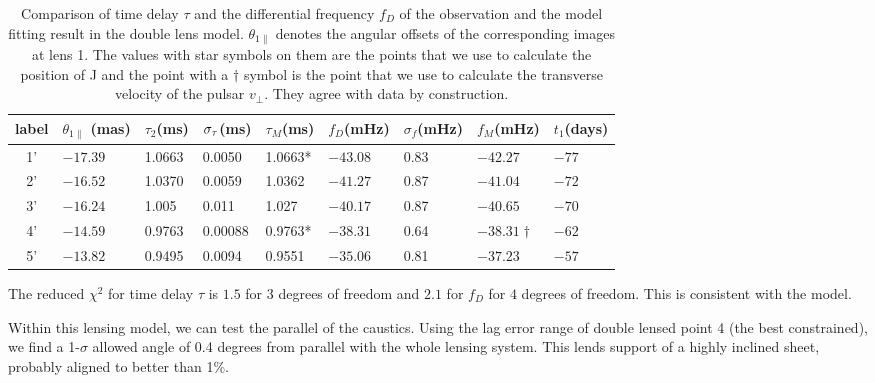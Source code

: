 \documentclass[useAMS,usenatbib]{mn2e}
\begin{document}
\begin{table}
\centering
\begin{tabular}{c|llllllll}
\hline
label&$\theta_{1\parallel}$ (mas)  & $\tau_2$(ms) & $\sigma_{\rm \tau}$(ms)  & $\tau_M$(ms) & $f_D$(mHz)  &$\sigma_{f}$(mHz)      &  $f_M$(mHz)& $t_1$(days) \\ \hline
1'& $-17.39$  &  1.0663     &0.0050    & 1.0663*        & $-43.08$    &0.83   & $-42.27$           & $-77$\\
 2'& $-16.52$  &    1.0370     &0.0059    & 1.0362       & $-41.27$    &0.87   & $-41.04$          & $-72$\\ 
3'& $-16.24$  &   1.005    &0.011   & 1.027          & $-40.17$    &0.87   & $-40.65$          & $-70$\\ 
 4'& $-14.59$  &   0.9763    &0.00088   & 0.9763*       & $-38.31$     &0.64    & $-38.31\dagger$ & $-62$\\ 
5'& $-13.82$  &    0.9495     &0.0094    & 0.9551       & $-35.06$     &0.81    & $-37.23$          & $-57$\\ 
 \hline
\end{tabular}
\caption{Comparison of time delay $\tau$ and the differential
  frequency $f_D$ of the observation and the model fitting result in the
  double lens model. $\theta_{1\parallel}$ denotes the angular offsets
  of the corresponding images at lens 1. 
The values with star symbols on them are the points that we use to
calculate the position of J and the point with a $\dagger$ symbol is
the point that we use to calculate the transverse velocity of the pulsar $v_{\bot}$.  They agree with data by construction. }
\label{table:double_lens_compare}
\end{table}

The reduced ${\chi}^2$ for time delay $\tau$ is $1.5$
for $3$ degrees of freedom
and $2.1$ for $f_D$ for $4$ degrees of freedom.  This is consistent
with the model.


Within this lensing model, we can test the parallel of the
caustics.  Using the lag error range of double lensed point 4 (the best
constrained), we find a 1-$\sigma$ allowed angle of 0.4 degrees from
parallel with the whole lensing system.  This lends support of a
highly inclined sheet, probably aligned to better than 1\%.
\end{document}

